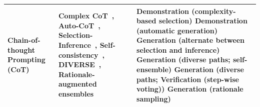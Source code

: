 \begin{table}[h!]
\begin{tabularx}{\textwidth}{|l|X|X|}
		\hline
		\textbf{Chain-of-thought Prompting (CoT)} & Complex CoT~\cite{fu2022complexity}, Auto-CoT~\cite{zhang2022automatic}, Selection-Inference~\cite{creswell2022selection}, Self-consistency~\cite{wang2022self}, DIVERSE~\cite{li2022making}, Rationale-augmented ensembles~\cite{wang2022rationale}                                                                                                                                                                                                                                                      & Demonstration (complexity-based selection) \newline Demonstration (automatic generation) \newline Generation (alternate between selection and inference) \newline Generation (diverse paths; self-ensemble) \newline Generation (diverse paths; Verification (step-wise voting)) \newline Generation (rationale sampling)                                                                                                                                                                                                                                                                                                                                                                                                                                                                                                                                                   \\
		\hline

\end{tabularx}
\end{table}
